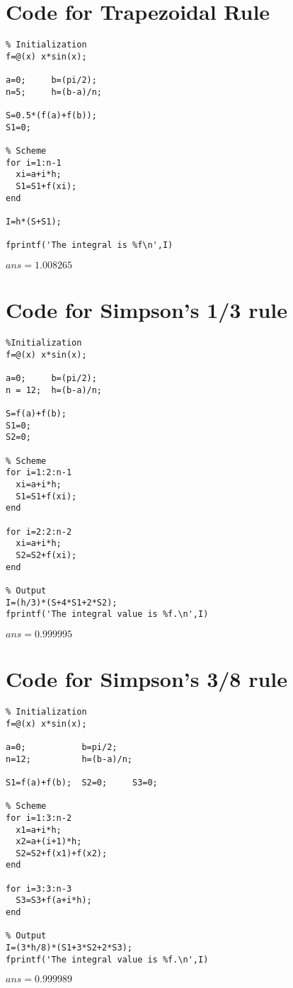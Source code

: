 \section{Code for Trapezoidal Rule}
\begin{verbatim}
% Initialization
f=@(x) x*sin(x);

a=0;     b=(pi/2);
n=5;     h=(b-a)/n;

S=0.5*(f(a)+f(b));
S1=0;

% Scheme
for i=1:n-1
  xi=a+i*h;
  S1=S1+f(xi);
end

I=h*(S+S1);

fprintf('The integral is %f\n',I)

\end{verbatim}
\(ans=1.008265\)


\section{Code for Simpson's 1/3 rule}
\begin{verbatim}
%Initialization
f=@(x) x*sin(x);

a=0;     b=(pi/2);
n = 12;  h=(b-a)/n;

S=f(a)+f(b);
S1=0;
S2=0;

% Scheme
for i=1:2:n-1
  xi=a+i*h;
  S1=S1+f(xi);
end

for i=2:2:n-2
  xi=a+i*h;
  S2=S2+f(xi);
end

% Output
I=(h/3)*(S+4*S1+2*S2);
fprintf('The integral value is %f.\n',I)

\end{verbatim}
\(ans=0.999995\)

\clearpage
\section{Code for Simpson's 3/8 rule}
\begin{verbatim}
% Initialization
f=@(x) x*sin(x);

a=0;           b=pi/2;
n=12;          h=(b-a)/n;

S1=f(a)+f(b);  S2=0;     S3=0;

% Scheme
for i=1:3:n-2
  x1=a+i*h;
  x2=a+(i+1)*h;
  S2=S2+f(x1)+f(x2);
end

for i=3:3:n-3
  S3=S3+f(a+i*h);
end

% Output
I=(3*h/8)*(S1+3*S2+2*S3);
fprintf('The integral value is %f.\n',I)

\end{verbatim}

\(ans=0.999989\)
